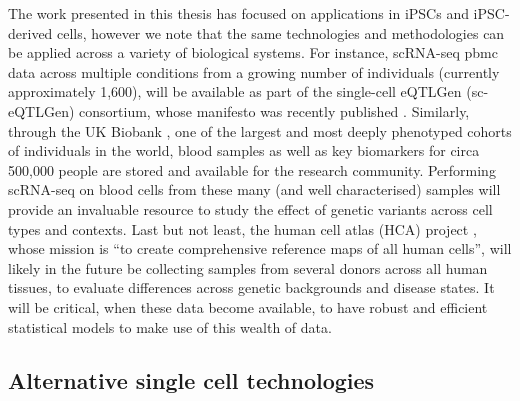 The work presented in this thesis has focused on applications in iPSCs and iPSC-derived cells, however we note that the same technologies and methodologies can be applied across a variety of biological systems.
For instance, scRNA-seq \gls{pbmc} data across multiple conditions from a growing number of individuals (currently approximately 1,600), will be available as part of the single-cell eQTLGen (sc-eQTLGen) consortium, whose manifesto was recently published \cite{van2020single1}.
Similarly, through the UK Biobank \cite{bycroft2018uk}, one of the largest and most deeply phenotyped cohorts of individuals in the world, blood samples as well as key biomarkers for circa 500,000 people are stored and available for the research community.
Performing scRNA-seq on blood cells from these many (and well characterised) samples will provide an invaluable resource to study the effect of genetic variants across cell types and contexts.
Last but not least, the human cell atlas (HCA) project \cite{regev2017science}, whose mission is “to create comprehensive reference maps of all human cells”, will likely in the future be collecting samples from several donors across all human tissues, to evaluate differences across genetic backgrounds and disease states.
It will be critical, when these data become available, to have robust and efficient statistical models to make use of this wealth of data.

\subsection{Alternative single cell technologies}

